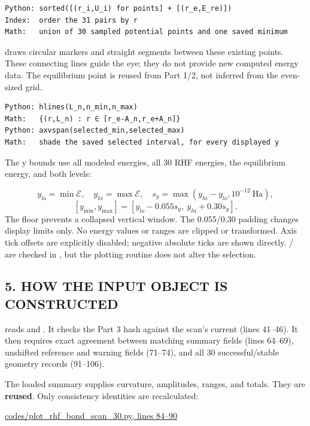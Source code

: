\documentclass[10pt,a4paper]{article}
\begin{document}
\begin{Verbatim}
Python: sorted([(r_i,U_i) for points] + [(r_e,E_re)])
Index:  order the 31 pairs by r
Math:   union of 30 sampled potential points and one saved minimum
\end{Verbatim}
 draws circular markers and straight segments between these existing points. These connecting lines guide the eye; they do not provide new computed energy data. The equilibrium point is reused from Part 1/2, not inferred from the even-sized grid.

\begin{Verbatim}
Python: hlines(L_n,n_min,n_max)
Math:   {(r,L_n) : r ∈ [r_e-A_n,r_e+A_n]}
Python: axvspan(selected_min,selected_max)
Math:   shade the saved selected interval, for every displayed y
\end{Verbatim}
The y bounds use all modeled energies, all 30 RHF energies, the equilibrium energy, and both levels:

\[
y_{lo}=\min\mathcal E,\quad y_{hi}=\max\mathcal E,\quad
s_y=\max(y_{hi}-y_{lo},10^{-12}\ \mathrm{Ha}),
\]
\[
[y_{\min},y_{\max}]=[y_{lo}-0.055s_y,\ y_{hi}+0.30s_y].
\]
The  floor prevents a collapsed vertical window. The 0.055/0.30 padding changes display limits only. No energy values or ranges are clipped or transformed. Axis tick offsets are explicitly disabled; negative absolute ticks are shown directly. / are checked in , but the plotting routine does not alter the selection.

\subsection{5. HOW THE INPUT OBJECT IS CONSTRUCTED}
 reads  and . It checks the Part 3 hash against the scan's current  (lines 41–46). It then requires exact agreement between matching summary fields (lines 64–69), unshifted reference and warning fields (71–74), and all 30 successful/stable geometry records (91–106).

The loaded summary supplies curvature, amplitudes, ranges, and totals. They are \textbf{reused}. Only consistency identities are recalculated:

\href{/Users/novaz/Desktop/qml2.0/codes/plot\_rhf\_bond\_scan\_30.py:84}{codes/plot\_rhf\_bond\_scan\_30.py, lines 84–90}
\end{document}
